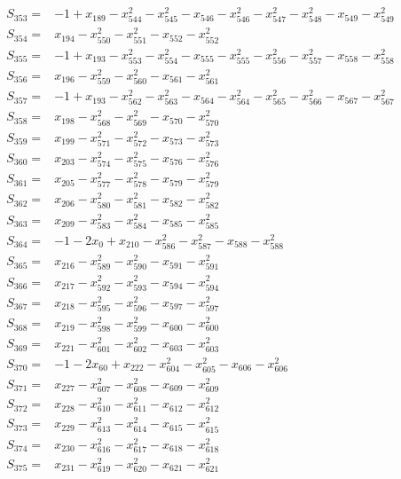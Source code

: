 \begin{align*}
S_{353}={}&-1+x_{189}-x_{544}^{2}-x_{545}^{2}-x_{546}-x_{546}^{2}-x_{547}^{2}-x_{548}^{2}-x_{549}-x_{549}^{2}\\[3pt]
S_{354}={}&x_{194}-x_{550}^{2}-x_{551}^{2}-x_{552}-x_{552}^{2}\\[3pt]
S_{355}={}&-1+x_{193}-x_{553}^{2}-x_{554}^{2}-x_{555}-x_{555}^{2}-x_{556}^{2}-x_{557}^{2}-x_{558}-x_{558}^{2}\\[3pt]
S_{356}={}&x_{196}-x_{559}^{2}-x_{560}^{2}-x_{561}-x_{561}^{2}\\[3pt]
S_{357}={}&-1+x_{193}-x_{562}^{2}-x_{563}^{2}-x_{564}-x_{564}^{2}-x_{565}^{2}-x_{566}^{2}-x_{567}-x_{567}^{2}\\[3pt]
S_{358}={}&x_{198}-x_{568}^{2}-x_{569}^{2}-x_{570}-x_{570}^{2}\\[3pt]
S_{359}={}&x_{199}-x_{571}^{2}-x_{572}^{2}-x_{573}-x_{573}^{2}\\[3pt]
S_{360}={}&x_{203}-x_{574}^{2}-x_{575}^{2}-x_{576}-x_{576}^{2}\\[3pt]
S_{361}={}&x_{205}-x_{577}^{2}-x_{578}^{2}-x_{579}-x_{579}^{2}\\[3pt]
S_{362}={}&x_{206}-x_{580}^{2}-x_{581}^{2}-x_{582}-x_{582}^{2}\\[3pt]
S_{363}={}&x_{209}-x_{583}^{2}-x_{584}^{2}-x_{585}-x_{585}^{2}\\[3pt]
S_{364}={}&-1-2x_{0}+x_{210}-x_{586}^{2}-x_{587}^{2}-x_{588}-x_{588}^{2}\\[3pt]
S_{365}={}&x_{216}-x_{589}^{2}-x_{590}^{2}-x_{591}-x_{591}^{2}\\[3pt]
S_{366}={}&x_{217}-x_{592}^{2}-x_{593}^{2}-x_{594}-x_{594}^{2}\\[3pt]
S_{367}={}&x_{218}-x_{595}^{2}-x_{596}^{2}-x_{597}-x_{597}^{2}\\[3pt]
S_{368}={}&x_{219}-x_{598}^{2}-x_{599}^{2}-x_{600}-x_{600}^{2}\\[3pt]
S_{369}={}&x_{221}-x_{601}^{2}-x_{602}^{2}-x_{603}-x_{603}^{2}\\[3pt]
S_{370}={}&-1-2x_{60}+x_{222}-x_{604}^{2}-x_{605}^{2}-x_{606}-x_{606}^{2}\\[3pt]
S_{371}={}&x_{227}-x_{607}^{2}-x_{608}^{2}-x_{609}-x_{609}^{2}\\[3pt]
S_{372}={}&x_{228}-x_{610}^{2}-x_{611}^{2}-x_{612}-x_{612}^{2}\\[3pt]
S_{373}={}&x_{229}-x_{613}^{2}-x_{614}^{2}-x_{615}-x_{615}^{2}\\[3pt]
S_{374}={}&x_{230}-x_{616}^{2}-x_{617}^{2}-x_{618}-x_{618}^{2}\\[3pt]
S_{375}={}&x_{231}-x_{619}^{2}-x_{620}^{2}-x_{621}-x_{621}^{2}\\[3pt]

\end{align*}
